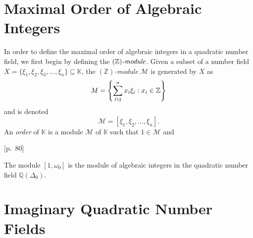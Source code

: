 \documentclass[11pt, letterpaper]{book}
\theoremstyle{definition}
\newcommand{\KK}{\mathbb{K}}
\newcommand{\MM}{\mathcal{M}}
\newcommand{\ZZ}{\mathbb{Z}}
\newcommand{\QQ}{\mathbb{Q}}
\begin{document}
\bigbreak
\section{Maximal Order of Algebraic Integers}
In order to define the maximal order of algebraic integers in a quadratic number field, we first begin by defining the $\emph{$(\ZZ)$-module}$.  Given a subset of a number field $X = \{ \xi_1, \xi_2, \xi_3, ..., \xi_n \} \subseteq \KK$, the \emph{$(\ZZ)$-module} $\MM$ is generated by $X$ as
\[
	M = \left \{ \sum_{i\1}^n x_i \xi_i : x_i \in \ZZ \right \}
\]
and is denoted
\[
	\MM = [ \xi_1, \xi_2, ..., \xi_n ].
\]
An \emph{order} of $\KK$ is a module $\MM$ of $\KK$ such that $1 \in \MM$ and 

\cite{JacobsonCh4}[p.~80]

The module $[1, \omega_0]$ is the module of algebraic integers in the quadratic number field $\QQ(\Delta_0)$.


\section{Imaginary Quadratic Number Fields}
\end{document}
